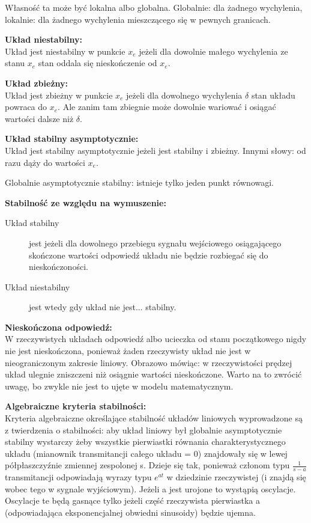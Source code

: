 Własność ta może być lokalna albo globalna. Globalnie: dla żadnego wychylenia, lokalnie: dla żadnego wychylenia mieszczącego się w pewnych granicach.

\textbf{Układ niestabilny:}\\
Układ jest niestabilny w punkcie $x_e$ jeżeli dla dowolnie małego wychylenia ze stanu $x_e$ stan oddala się nieskończenie od $x_e$.

\textbf{Układ zbieżny:}\\
Układ jest zbieżny w punkcie $x_e$ jeżeli dla dowolnego wychylenia $\delta$ stan układu powraca do $x_e$. Ale zanim tam zbiegnie może dowolnie wariować i osiągać wartości dalsze niż $\delta$.

\textbf{Układ stabilny asymptotycznie:}\\
Układ jest stabilny asymptotycznie jeżeli jest stabilny i zbieżny. Innymi słowy: od razu dąży do wartości $x_e$.

Globalnie asymptotycznie stabilny: istnieje tylko jeden punkt równowagi.

\textbf{Stabilność ze względu na wymuszenie:}
\begin{description}
    \item[Układ stabilny] jest jeżeli dla dowolnego przebiegu sygnału wejściowego osiągającego skończone wartości odpowiedź układu nie będzie rozbiegać się do nieskończoności.
    \item[Układ niestabilny] jest wtedy gdy układ nie jest... stabilny.
\end{description}

\textbf{Nieskończona odpowiedź:}\\
W rzeczywistych układach odpowiedź albo ucieczka od stanu początkowego nigdy nie jest nieskończona, ponieważ żaden rzeczywisty układ nie jest w nieograniczonym zakresie liniowy. Obrazowo mówiąc: w rzeczywistości prędzej układ ulegnie zniszczeni niż osiągnie wartości nieskończone. Warto na to zwrócić uwagę, bo zwykle nie jest to ujęte w modelu matematycznym.

\textbf{Algebraiczne kryteria stabilności:}\\
Kryteria algebraiczne określające stabilność układów liniowych wyprowadzone są z twierdzenia o stabilności: aby układ liniowy był globalnie asymptotycznie stabilny wystarczy żeby wszystkie pierwiastki równania charakterystycznego układu (mianownik transmitancji całego układu = 0) znajdowały się w lewej półpłaszczyźnie zmiennej zespolonej s. Dzieje się tak, ponieważ członom typu $\frac{1}{s-a}$ transmitancji odpowiadają wyrazy typu $e^{at}$ w dziedzinie rzeczywistej (i znajdą się wobec tego w sygnale wyjściowym). Jeżeli a jest urojone to wystąpią oscylacje. Oscylacje te będą gasnące tylko jeżeli część rzeczywista pierwiastka a (odpowiadająca eksponencjalnej obwiedni sinusoidy) będzie ujemna.

